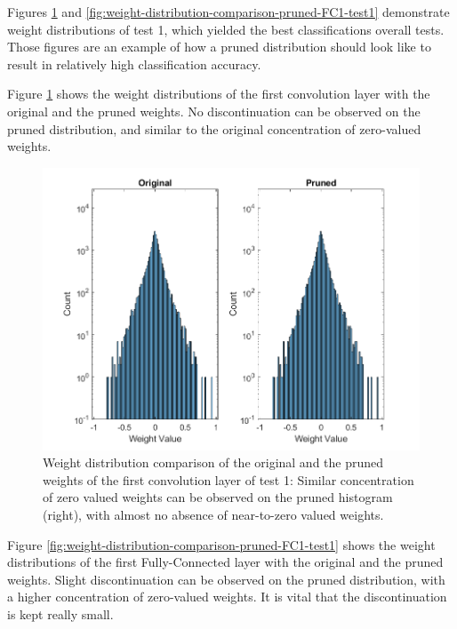 Figures \ref{fig:weight-distribution-comparison-pruned-conv1-test1} and \ref{fig:weight-distribution-comparison-pruned-FC1-test1} demonstrate weight distributions of test 1, which yielded the best classifications overall tests. Those figures are an example of how a pruned distribution should look like to result in relatively high classification accuracy.

Figure \ref{fig:weight-distribution-comparison-pruned-conv1-test1} shows the weight distributions of the first convolution layer with the original and the pruned weights. No discontinuation can be observed on the pruned distribution, and similar to the original concentration of zero-valued weights.

\begin{figure} [H]
	\centering
	\includegraphics[width=\textwidth]{../Images/Weights-distributions/pruned/37.97/weight-distribution-conv1.png}
	\decoRule
	\caption[Weight distribution comparison of the original and the pruned weights of the first convolution layer of test 1]{Weight distribution comparison of the original and the pruned weights of the first convolution layer of test 1: Similar concentration of zero valued weights can be observed on the pruned histogram (right), with almost no absence of near-to-zero valued weights.}
	\label{fig:weight-distribution-comparison-pruned-conv1-test1}
\end{figure}

Figure \ref{fig:weight-distribution-comparison-pruned-FC1-test1} shows the weight distributions of the first Fully-Connected layer with the original and the pruned weights. Slight discontinuation can be observed on the pruned distribution, with a higher concentration of zero-valued weights. It is vital that the discontinuation is kept really small.

